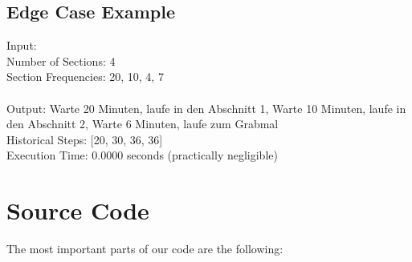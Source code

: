 \documentclass[a4paper,10pt,english]{scrartcl}
\begin{document}
\subsection*{Edge Case Example}
Input:\\
Number of Sections: 4\\
Section Frequencies: 20, 10, 4, 7\\
\\
\noindent Output: Warte 20 Minuten, laufe in den Abschnitt 1, Warte 10 Minuten, laufe in den Abschnitt 2, Warte 6 Minuten, laufe zum Grabmal\\
\noindent Historical Steps: [20, 30, 36, 36]\\
\noindent Execution Time: 0.0000 seconds (practically negligible)

\section{Source Code}
The most important parts of our code are the following:
\end{document}
